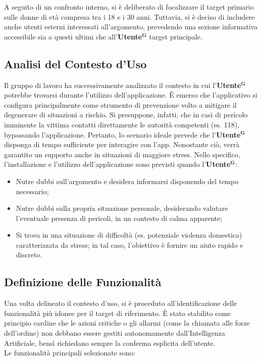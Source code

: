 \documentclass[a4paper,12pt]{article}
\newcommand{\term}[1]{\textbf{#1}$^\mathbf{G}$}
\begin{document}
A seguito di un confronto interno, si è deliberato di focalizzare il target primario sulle donne di età compresa tra i 18 e i 30 anni. Tuttavia, si è deciso di includere anche utenti esterni interessati all'argomento, prevedendo una sezione informativa accessibile sia a questi ultimi che all'\term{Utente} target principale.

\subsection{Analisi del Contesto d'Uso}
Il gruppo di lavoro ha successivamente analizzato il contesto in cui l'\term{Utente} potrebbe trovarsi durante l'utilizzo dell'applicazione.
È emerso che l'applicativo si configura principalmente come strumento di prevenzione volto a mitigare il degenerare di situazioni a rischio. Si presuppone, infatti, che in casi di pericolo imminente la vittima contatti direttamente le autorità competenti (es. 118), bypassando l'applicazione. Pertanto, lo scenario ideale prevede che l'\term{Utente} disponga di tempo sufficiente per interagire con l'app. Nonostante ciò, verrà garantito un supporto anche in situazioni di maggiore stress.
Nello specifico, l'installazione e l'utilizzo dell'applicazione sono previsti quando l'\term{Utente}:

\begin{itemize}
    \item Nutre dubbi sull'argomento e desidera informarsi disponendo del tempo necessario;
    \item Nutre dubbi sulla propria situazione personale, desiderando valutare l'eventuale presenza di pericoli, in un contesto di calma apparente;
    \item Si trova in una situazione di difficoltà (es. potenziale violenza domestica) caratterizzata da stress; in tal caso, l'obiettivo è fornire un aiuto rapido e discreto.
\end{itemize}

\subsection{Definizione delle Funzionalità}
Una volta delineato il contesto d'uso, si è proceduto all'identificazione delle funzionalità più idonee per il target di riferimento. È stato stabilito come principio cardine che le azioni critiche o gli allarmi (come la chiamata alle forze dell'ordine) non debbano essere gestiti autonomamente dall'Intelligenza Artificiale, bensì richiedano sempre la conferma esplicita dell'utente. 
\\Le funzionalità principali selezionate sono:
\end{document}
